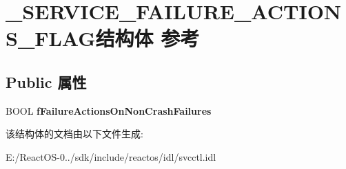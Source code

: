 \hypertarget{struct___s_e_r_v_i_c_e___f_a_i_l_u_r_e___a_c_t_i_o_n_s___f_l_a_g}{}\section{\+\_\+\+S\+E\+R\+V\+I\+C\+E\+\_\+\+F\+A\+I\+L\+U\+R\+E\+\_\+\+A\+C\+T\+I\+O\+N\+S\+\_\+\+F\+L\+A\+G结构体 参考}
\label{struct___s_e_r_v_i_c_e___f_a_i_l_u_r_e___a_c_t_i_o_n_s___f_l_a_g}
\subsection*{Public 属性}
\begin{DoxyCompactItemize}
\item 
\mbox{\label{struct___s_e_r_v_i_c_e___f_a_i_l_u_r_e___a_c_t_i_o_n_s___f_l_a_g_aefe56536d665f7e7962389b38c840c93}} 
B\+O\+OL {\bfseries f\+Failure\+Actions\+On\+Non\+Crash\+Failures}
\end{DoxyCompactItemize}


该结构体的文档由以下文件生成\+:\begin{DoxyCompactItemize}
\item 
E\+:/\+React\+O\+S-\/0../sdk/include/reactos/idl/svcctl.\+idl\end{DoxyCompactItemize}
